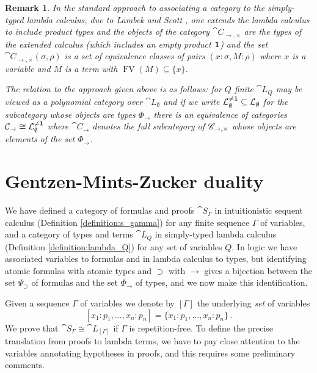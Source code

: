 \documentclass[english,letter paper,12pt,leqno]{article}
\theoremstyle{example}
\newtheorem{remark}[theorem]{Remark}
\numberwithin{equation}{section}
\def\FV{\operatorname{FV}}
\def\typearrow{\rightarrow}
\def\imp{\supset}
\begin{document}
\begin{remark}
In the standard approach to associating a category to the simply-typed lambda calculus, due to Lambek and Scott \cite[\S I.11]{lambek_scott}, one extends the lambda calculus to include product types and the objects of the category $\cat{C}_{\typearrow, \times}$ are the types of the extended calculus (which includes an empty product $\bold{1}$) and the set $\cat{C}_{\typearrow, \times}(\sigma, \rho)$ is a set of equivalence classes of pairs $(x:\sigma, M:\rho)$ where $x$ is a variable and $M$ is a term with $\FV(M) \subseteq \{ x \}$. 

The relation to the approach given above is as follows: for $Q$ finite $\cat{L}_Q$ may be viewed as a polynomial category over $\cat{L}_{\emptyset}$ and if we write $\mathcal{L}_{\emptyset}^{\neq \bold{1}} \subseteq \mathcal{L}_{\emptyset}$ for the subcategory whose objects are types $\Phi_{\typearrow}$ there is an equivalence of categories $\cat{C}_{\typearrow} \cong \cat{L}_{\emptyset}^{\neq \bold{1}}$ where $\cat{C}_{\typearrow}$ denotes the full subcategory of $\scr{C}_{\typearrow, \times}$ whose objects are elements of the set $\Phi_{\typearrow}$.
\end{remark}



\section{Gentzen-Mints-Zucker duality}
\label{chiso}

We have defined a category of formulas and proofs $\cat{S}_\Gamma$ in intuitionistic sequent calculus (Definition \ref{definition:s_gamma}) for any finite sequence $\Gamma$ of variables, and a category of types and terms $\cat{L}_Q$ in simply-typed lambda calculus (Definition \ref{definition:lambda_Q}) for any set of variables $Q$. In logic we have associated variables to formulas and in lambda calculus to types, but identifying atomic formulas with atomic types and $\imp$ with $\rightarrow$ gives a bijection between the set $\Psi_{\imp}$ of formulas and the set $\Phi_{\rightarrow}$ of types, and we now make this identification. 

Given a sequence $\Gamma$ of variables we denote by $[\Gamma]$ the underlying \emph{set} of variables
\[
[ x_1: p_1, \ldots, x_n: p_n ] = \{ x_1: p_1, \ldots, x_n: p_n \}\,.
\]
We prove that $\cat{S}_\Gamma \cong \cat{L}_{[\Gamma]}$ if $\Gamma$ is repetition-free. To define the precise translation from proofs to lambda terms, we have to pay close attention to the variables annotating hypotheses in proofs, and this requires some preliminary comments.
\end{document}
